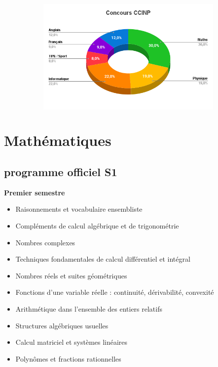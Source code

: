 \documentclass{beamer}
\begin{document}
\begin{frame}
\begin{figure}[h]
\begin{subfigure}{0.49\textwidth}
        \end{subfigure}
        \begin{subfigure}{0.49\textwidth}
            \includegraphics[width=0.95\linewidth]{ressource_diapo/CCINP.png}
        \end{subfigure}
    \end{figure}
\end{frame}

\section{Mathématiques}

\subsection{programme officiel S1}

\begin{frame}
    \textbf{Premier semestre}
    \begin{itemize}
        \item Raisonnements et vocabulaire ensembliste
        \item Compléments de calcul algébrique et de trigonométrie
        \item Nombres complexes
        \item Techniques fondamentales de calcul différentiel et intégral
        \item Nombres réels et suites géométriques
        \item Fonctions d'une variable réelle : continuité, dérivabilité, convexité
        \item Arithmétique dans l'ensemble des entiers relatifs
        \item Structures algébriques usuelles
        \item Calcul matriciel et systèmes linéaires
        \item Polynômes et fractions rationnelles
    \end{itemize}
\end{frame}
\end{document}
